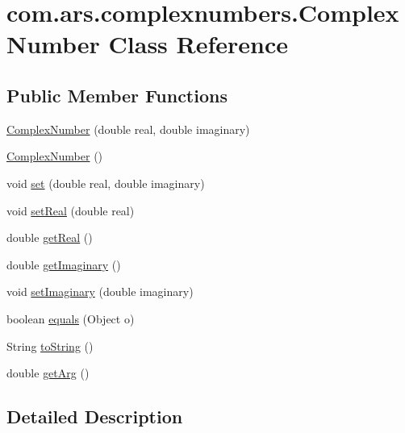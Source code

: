 \hypertarget{classcom_1_1ars_1_1complexnumbers_1_1_complex_number}{}\section{com.\+ars.\+complexnumbers.\+Complex\+Number Class Reference}
\label{classcom_1_1ars_1_1complexnumbers_1_1_complex_number}
\subsection*{Public Member Functions}
\begin{DoxyCompactItemize}
\item 
\hyperlink{classcom_1_1ars_1_1complexnumbers_1_1_complex_number_a8798b32c39932a90436b5ef1d8bd83a4}{Complex\+Number} (double real, double imaginary)
\item 
\hyperlink{classcom_1_1ars_1_1complexnumbers_1_1_complex_number_a5c911c206c51fe7c3558e32147d22d12}{Complex\+Number} ()
\item 
void \hyperlink{classcom_1_1ars_1_1complexnumbers_1_1_complex_number_ac93a6120b2d6576dac75c256f0cd667f}{set} (double real, double imaginary)
\item 
void \hyperlink{classcom_1_1ars_1_1complexnumbers_1_1_complex_number_ae13ab597ac2208a3915398ee075a7b69}{set\+Real} (double real)
\item 
double \hyperlink{classcom_1_1ars_1_1complexnumbers_1_1_complex_number_a4cb4de35836a0ca818d3f2ce2df07736}{get\+Real} ()
\item 
double \hyperlink{classcom_1_1ars_1_1complexnumbers_1_1_complex_number_a611fa4712cc691cf1e13e91f182c1850}{get\+Imaginary} ()
\item 
void \hyperlink{classcom_1_1ars_1_1complexnumbers_1_1_complex_number_a728d224cd650d2e5ab62acd3159a4989}{set\+Imaginary} (double imaginary)
\item 
boolean \hyperlink{classcom_1_1ars_1_1complexnumbers_1_1_complex_number_a8dd0d197e07c92cb3f7e98697a18d96f}{equals} (Object o)
\item 
String \hyperlink{classcom_1_1ars_1_1complexnumbers_1_1_complex_number_ab55fe26ece82d837fc4db3ab88577aa0}{to\+String} ()
\item 
double \hyperlink{classcom_1_1ars_1_1complexnumbers_1_1_complex_number_a7cbe3a7d9d1e409b2c00cfd34e95b3e8}{get\+Arg} ()
\end{DoxyCompactItemize}


\subsection{Detailed Description}
